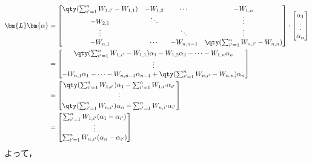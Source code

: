 \documentclass[class=jsarticle, crop=false, dvipdfmx, fleqn]{standalone}
\begin{document}
\begin{align*}
    \bm{L} \bm{\alpha}
        & =
            \begin{bmatrix}
                \qty(\sum_{i'=1}^{n} W_{1, i'} - W_{1, 1}) & -W_{1, 2} & \cdots & -W_{1, n} \\
                -W_{2, 1} & \ddots & & \vdots \\
                \vdots & & \ddots & \vdots \\
                -W_{n, 1} & \cdots & -W_{n, n-1} & \qty(\sum_{i'=1}^{n} W_{n, i'} - W_{n, n})
            \end{bmatrix}
            \cdot
            \begin{bmatrix}
                \alpha_1 \\ \vdots \\ \alpha_n
            \end{bmatrix}
        \\
        & =
            \begin{bmatrix}
                \qty(\sum_{i'=1}^{n} W_{1, i'} - W_{1, 1}) \alpha_1 - W_{1, 2} \alpha_2 - \cdots - W_{1, n} \alpha_n \\
                \vdots \\
                -W_{n, 1} \alpha_1 - \cdots - W_{n, n-1} \alpha_{n-1} + \qty(\sum_{i'=1}^{n} W_{n, i'} - W_{n, n}) \alpha_n
            \end{bmatrix}
        \\
        & =
            \begin{bmatrix}
                \qty(\sum_{i'=1}^{n} W_{1, i'}) \alpha_1 - \sum_{i'=1}^{n} W_{1, i'} \alpha_{i'} \\
                \vdots \\
                \qty(\sum_{i'=1}^{n} W_{n, i'}) \alpha_n - \sum_{i'=1}^{n} W_{n, i'} \alpha_{i'}
            \end{bmatrix}
        \\
        & =
        \begin{bmatrix}
            \sum_{i'=1}^{n} W_{1, i'} (\alpha_1 - \alpha_{i'}) \\
            \vdots \\
            \sum_{i'=1}^{n} W_{n, i'} (\alpha_n - \alpha_{i'})
        \end{bmatrix}
\end{align*}
よって，
\end{document}
